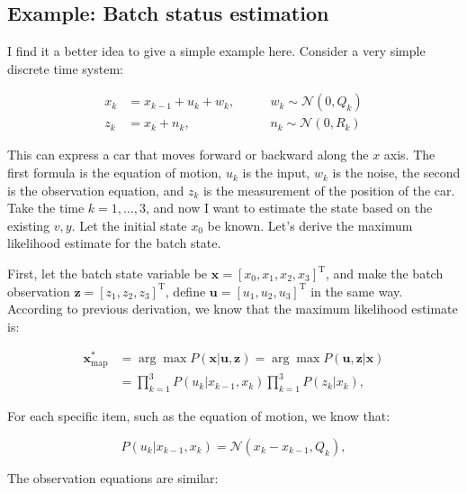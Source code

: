 \subsection{Example: Batch status estimation}

I find it a better idea to give a simple example here. Consider a very simple discrete time system:

\begin{equation}
\begin{array}{lll}
{x_k} &= {x_{k - 1}} + {u_k} + {w_k},&\qquad w_k \sim \mathcal{N}\left( {0,Q_k} \right)\\
{z_k} &= {x_k} + {n_k},&\qquad {n_k}\sim \mathcal{N}\left( {0,R_k} \right)
\end{array}
\end{equation}

This can express a car that moves forward or backward along the $x$ axis. The first formula is the equation of motion, $u_k$ is the input, $w_k$ is the noise, the second is the observation equation, and $z_k$ is the measurement of the position of the car. Take the time $k=1, \ldots, 3$, and now I want to estimate the state based on the existing $v,y$. Let the initial state $x_0$ be known. Let's derive the maximum likelihood estimate for the batch state.

First, let the batch state variable be $\bm{x} = [x_0,x_1, x_2, x_3]^\mathrm{T}$, and make the batch observation $\bm{z} = [z_1,z_2,z_3]^ \mathrm{T}$, define $\bm{u}=[u_1,u_2,u_3]^\mathrm{T}$ in the same way. According to previous derivation, we know that the maximum likelihood estimate is:

\begin{equation}
\begin{aligned}
{\bm{x}_{\mathrm{map}}^*} &= \arg \max P(\bm{x}|\bm{u},\bm{z}) = \arg \max P(\bm{u},\bm{z}|\bm{x})\\
&= \prod\limits_{k = 1}^3 {P({u_k}|{x_{k - 1}},{x_k})\prod\limits_{k = 1}^3 {P\left( {{z_k}|{x_k}} \right)} }, 
\end{aligned}
\end{equation}

For each specific item, such as the equation of motion, we know that:

\begin{equation}
P({u_k}|{x_{k - 1}},{x_k}) = \mathcal{N}({x_k} - {x_{k - 1}},{Q_k}),
\end{equation}

The observation equations are similar:

